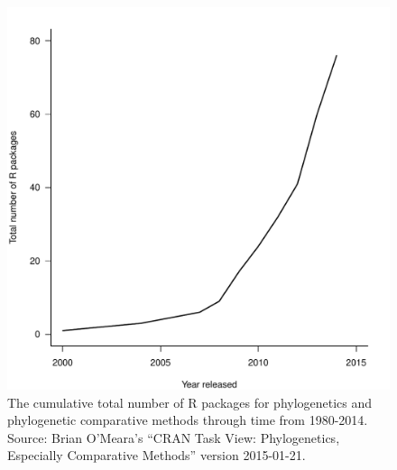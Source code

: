 \documentclass[a4paper,12pt]{article}
\begin{document}
\newpage
  \begin{figure}[!htbp]
    \centering
      \includegraphics[width=12cm]{Figures/PCMRpackages.pdf}
      \caption{The cumulative total number of R packages for phylogenetics and phylogenetic comparative methods through time from 1980-2014. Source: Brian O'Meara's ``CRAN Task View: Phylogenetics, Especially Comparative Methods'' version 2015-01-21.}
      \label{PCMRpackages}
  \end{figure}
\end{document}
